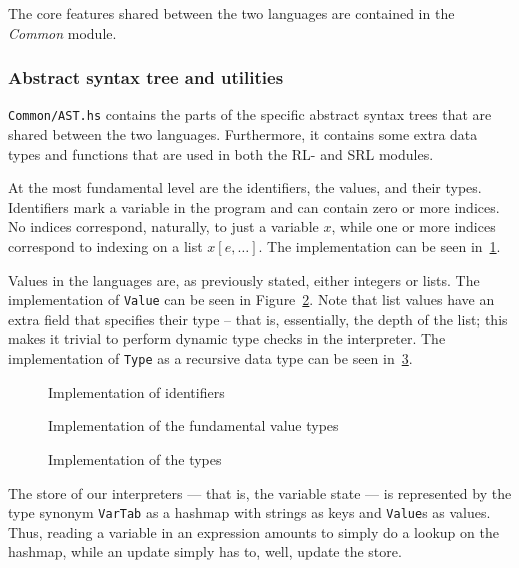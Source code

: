 The core features shared between the two languages are contained in the \textit{Common} module.

\subsubsection{Abstract syntax tree and utilities}
\texttt{Common/AST.hs} contains the parts of the specific abstract syntax trees that are shared between the two languages. Furthermore, it contains some extra data types and functions that are used in both the RL- and SRL modules.

At the most fundamental level are the identifiers, the values, and their types. Identifiers mark a variable in the program and can contain zero or more indices. No indices correspond, naturally, to just a variable $x$, while one or more indices correspond to indexing on a list $x[e,\dots]$. The implementation can be seen in~\ref{fig:identifier}.

Values in the languages are, as previously stated, either integers or lists. The implementation of \texttt{Value} can be seen in Figure~\ref{fig:val}. Note that list values have an extra field that specifies their type -- that is, essentially, the depth of the list; this makes it trivial to perform dynamic type checks in the interpreter. The implementation of \texttt{Type} as a recursive data type can be seen in~\ref{fig:type}.

\begin{figure}[H]
  
  \caption{Implementation of identifiers}\label{fig:identifier}
\end{figure}
\begin{figure}[H]
  
  \caption{Implementation of the fundamental value types}\label{fig:val}
\end{figure}
\begin{figure}[H]
  
  \caption{Implementation of the types}\label{fig:type}
\end{figure}

\noindent The store of our interpreters --- that is, the variable state --- is represented by the type synonym \texttt{VarTab} as a hashmap with strings as keys and \texttt{Value}s as values. Thus, reading a variable in an expression amounts to simply do a lookup on the hashmap, while an update simply has to, well, update the store.\\

